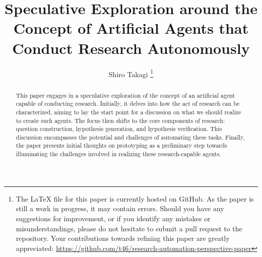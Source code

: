 \documentclass{article}
\title{Speculative Exploration around the Concept of Artificial Agents that Conduct Research Autonomously}
\author{Shiro Takagi \footnote{The LaTeX file for this paper is currently hosted on GitHub. As the paper is still a work in progress, it may contain errors. Should you have any suggestions for improvement, or if you identify any mistakes or misunderstandings, please do not hesitate to submit a pull request to the repository. Your contributions towards refining this paper are greatly appreciated: \href{https://github.com/t46/research-automation-perspective-paper}{https://github.com/t46/research-automation-perspective-paper} }}
\begin{document}
\sloppy
\maketitle

\begin{abstract}
This paper engages in a speculative exploration of the concept of an artificial agent capable of conducting research. Initially, it delves into how the act of research can be characterized, aiming to lay the start point for a discussion on what we should realize to create such agents. The focus then shifts to the core components of research: question construction, hypothesis generation, and hypothesis verification. This discussion encompasses the potential and challenges of automating these tasks. Finally, the paper presents initial thoughts on prototyping as a preliminary step towards illuminating the challenges involved in realizing these research-capable agents.
\end{abstract}

\tableofcontents




% 
% 
% 



% 


\appendix

\end{document}

